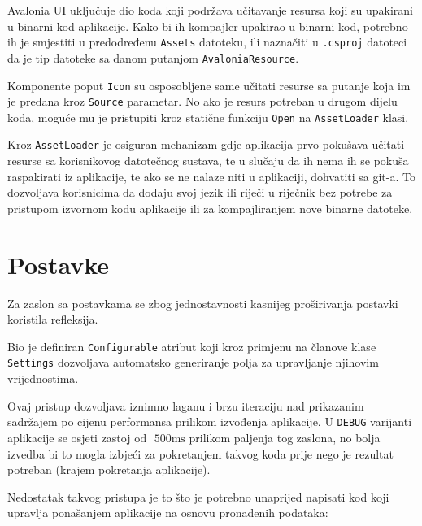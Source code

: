 \documentclass[12pt,a4paper]{report}
\begin{document}
Avalonia UI uključuje dio koda koji podržava učitavanje resursa koji su
upakirani u binarni kod aplikacije. Kako bi ih kompajler upakirao u binarni kod,
potrebno ih je smjestiti u predodređenu \verb|Assets| datoteku, ili naznačiti u
\verb|.csproj| datoteci da je tip datoteke sa danom putanjom
\verb|AvaloniaResource|.

Komponente poput \verb|Icon| su osposobljene same učitati resurse sa putanje
koja im je predana kroz \verb|Source| parametar. No ako je resurs potreban u
drugom dijelu koda, moguće mu je pristupiti kroz statične funkciju \verb|Open|
na \verb|AssetLoader| klasi.

Kroz \verb|AssetLoader| je osiguran mehanizam gdje aplikacija prvo pokušava
učitati resurse sa korisnikovog datotečnog sustava, te u slučaju da ih nema ih
se pokuša raspakirati iz aplikacije, te ako se ne nalaze niti u aplikaciji,
dohvatiti sa git-a. To dozvoljava korisnicima da dodaju svoj jezik ili riječi
u riječnik bez potrebe za pristupom izvornom kodu aplikacije ili za
kompajliranjem nove binarne datoteke.

\section{Postavke}

Za zaslon sa postavkama se zbog jednostavnosti kasnijeg proširivanja postavki
koristila refleksija.

Bio je definiran \verb|Configurable| atribut koji kroz primjenu na članove klase
\\\verb|Settings| dozvoljava automatsko generiranje polja za upravljanje
njihovim vrijednostima.

Ovaj pristup dozvoljava iznimno laganu i brzu iteraciju nad prikazanim sadržajem
po cijenu performansa prilikom izvođenja aplikacije. U \verb|DEBUG| varijanti
aplikacije se osjeti zastoj od $\text{~}500\text{ms}$ prilikom paljenja tog
zaslona, no bolja izvedba bi to mogla izbjeći za pokretanjem takvog koda prije
nego je rezultat potreban (krajem pokretanja aplikacije).

Nedostatak takvog pristupa je to što je potrebno unaprijed napisati kod koji
upravlja ponašanjem aplikacije na osnovu pronađenih podataka:
\end{document}
